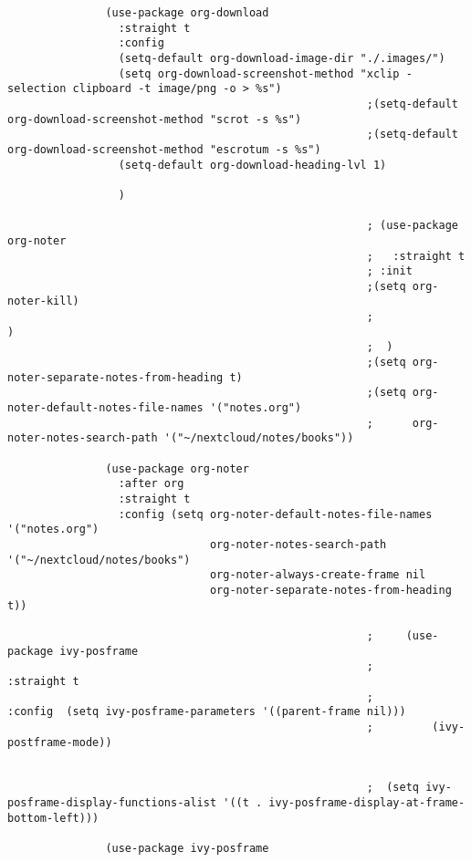 \documentclass[11pt]{article}
\begin{document}
\begin{verbatim}
               (use-package org-download
                 :straight t
                 :config
                 (setq-default org-download-image-dir "./.images/")
                 (setq org-download-screenshot-method "xclip -selection clipboard -t image/png -o > %s")
                                                       ;(setq-default org-download-screenshot-method "scrot -s %s")
                                                       ;(setq-default org-download-screenshot-method "escrotum -s %s")
                 (setq-default org-download-heading-lvl 1)

                 )

                                                       ; (use-package org-noter
                                                       ;   :straight t
                                                       ; :init
                                                       ;(setq org-noter-kill)
                                                       ;                         )
                                                       ;  )
                                                       ;(setq org-noter-separate-notes-from-heading t)
                                                       ;(setq org-noter-default-notes-file-names '("notes.org")
                                                       ;      org-noter-notes-search-path '("~/nextcloud/notes/books"))

               (use-package org-noter
                 :after org
                 :straight t
                 :config (setq org-noter-default-notes-file-names '("notes.org")
                               org-noter-notes-search-path '("~/nextcloud/notes/books")
                               org-noter-always-create-frame nil
                               org-noter-separate-notes-from-heading t))

                                                       ;     (use-package ivy-posframe
                                                       ;           :straight t
                                                       ;          :config  (setq ivy-posframe-parameters '((parent-frame nil)))
                                                       ;         (ivy-postframe-mode))


                                                       ;  (setq ivy-posframe-display-functions-alist '((t . ivy-posframe-display-at-frame-bottom-left)))

               (use-package ivy-posframe


\end{verbatim}
\end{document}
